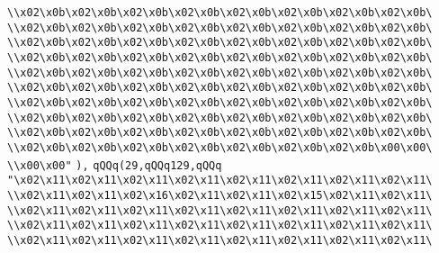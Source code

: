 \verb|\\x02\x0b\x02\x0b\x02\x0b\x02\x0b\x02\x0b\x02\x0b\x02\x0b\x02\x0b\|\newline
\verb|\\x02\x0b\x02\x0b\x02\x0b\x02\x0b\x02\x0b\x02\x0b\x02\x0b\x02\x0b\|\newline
\verb|\\x02\x0b\x02\x0b\x02\x0b\x02\x0b\x02\x0b\x02\x0b\x02\x0b\x02\x0b\|\newline
\verb|\\x02\x0b\x02\x0b\x02\x0b\x02\x0b\x02\x0b\x02\x0b\x02\x0b\x02\x0b\|\newline
\verb|\\x02\x0b\x02\x0b\x02\x0b\x02\x0b\x02\x0b\x02\x0b\x02\x0b\x02\x0b\|\newline
\verb|\\x02\x0b\x02\x0b\x02\x0b\x02\x0b\x02\x0b\x02\x0b\x02\x0b\x02\x0b\|\newline
\verb|\\x02\x0b\x02\x0b\x02\x0b\x02\x0b\x02\x0b\x02\x0b\x02\x0b\x02\x0b\|\newline
\verb|\\x02\x0b\x02\x0b\x02\x0b\x02\x0b\x02\x0b\x02\x0b\x02\x0b\x02\x0b\|\newline
\verb|\\x02\x0b\x02\x0b\x02\x0b\x02\x0b\x02\x0b\x02\x0b\x02\x0b\x02\x0b\|\newline
\verb|\\x02\x0b\x02\x0b\x02\x0b\x02\x0b\x02\x0b\x02\x0b\x02\x0b\x00\x00\|\newline
\verb|\\x00\x00"|\newline
\verb|),|\newline
\verb|qQQq(29,qQQq129,qQQq|\newline
\verb|"\x02\x11\x02\x11\x02\x11\x02\x11\x02\x11\x02\x11\x02\x11\x02\x11\|\newline
\verb|\\x02\x11\x02\x11\x02\x16\x02\x11\x02\x11\x02\x15\x02\x11\x02\x11\|\newline
\verb|\\x02\x11\x02\x11\x02\x11\x02\x11\x02\x11\x02\x11\x02\x11\x02\x11\|\newline
\verb|\\x02\x11\x02\x11\x02\x11\x02\x11\x02\x11\x02\x11\x02\x11\x02\x11\|\newline
\verb|\\x02\x11\x02\x11\x02\x11\x02\x11\x02\x11\x02\x11\x02\x11\x02\x11\|\newline

